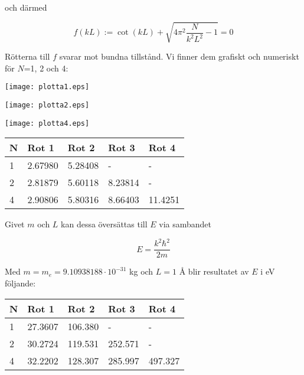\documentclass[12pt,a4paper]{article}
\begin{document}
och därmed

\begin{equation*}
f(kL):=\cot(kL)+\sqrt{4\pi^2\frac{N}{k^2L^2}-1}=0
\end{equation*}

Rötterna till $f$ svarar mot bundna tillstånd. Vi finner dem grafiskt och numeriskt för $N$=1, 2 och 4:

\begin{figure*}[h!]
\centering
\texttt{[image: plotta1.eps]}
\caption*{$N=1$}
\end{figure*}

\newpage

\begin{figure*}[h!]
\centering
\texttt{[image: plotta2.eps]}
\caption*{$N=2$}
\end{figure*}

\begin{figure*}[h!]
\centering
\texttt{[image: plotta4.eps]}
\caption*{$N=4$}
\end{figure*}

\begin{center}
\begin{tabular}{|l|l|l|l|l|}
\hline
N & Rot 1 & Rot 2 & Rot 3 & Rot 4 \\
\hline
1 & 2.67980 & 5.28408 & - & - \\
2 & 2.81879 & 5.60118 & 8.23814 & - \\
4 & 2.90806 & 5.80316 & 8.66403 & 11.4251 \\
\hline
\end{tabular}
\end{center}

Givet $m$ och $L$ kan dessa översättas till $E$ via sambandet

\begin{equation*}
E=\frac{k^2\hbar^2}{2m}
\end{equation*}

Med $m=m_e=9.10938188\cdot10^{-31}$ kg och $L=1$ Å blir resultatet av $E$ i eV följande:
\begin{center}
\begin{tabular}{|l|l|l|l|l|}
\hline
N & Rot 1 & Rot 2 & Rot 3 & Rot 4 \\
\hline
1 & 27.3607 & 106.380 & - & - \\
2 & 30.2724 & 119.531 & 252.571 & - \\
4 & 32.2202 & 128.307 & 285.997 & 497.327 \\
\hline
\end{tabular}
\end{center}
\end{document}
